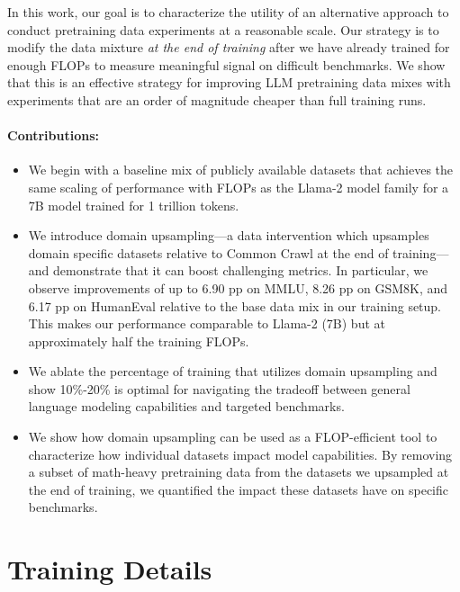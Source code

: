 \documentclass[10pt]{article} %
\begin{document}
In this work, our goal is to characterize the utility of an alternative approach to conduct pretraining data experiments at a reasonable scale.
Our strategy is to modify the data mixture \textit{at the end of training} after we have already trained for enough FLOPs to measure meaningful signal on difficult benchmarks.
We show that this is an effective strategy for improving LLM pretraining data mixes with experiments that are an order of magnitude cheaper than full training runs.

\paragraph{Contributions:} 
\begin{itemize}
\itemsep0em
    \item We begin with a baseline mix of publicly available datasets that achieves the same scaling of performance with FLOPs as the Llama-2 model family for a 7B model trained for 1 trillion tokens.
    \item We introduce domain upsampling---a data intervention which upsamples domain specific datasets relative to Common Crawl at the end of training---and demonstrate that it can boost challenging metrics. In particular, we observe improvements of up to 6.90 pp on MMLU, 8.26 pp on GSM8K, and 6.17 pp on HumanEval relative to the base data mix in our training setup.  This makes our performance comparable to Llama-2 (7B) but at approximately half the training FLOPs.
    \item We ablate the percentage of training that utilizes domain upsampling and show  10\%-20\% is optimal for navigating the tradeoff between general language modeling capabilities and targeted benchmarks.
    \item We show how domain upsampling can be used as a FLOP-efficient tool to characterize how individual datasets impact model capabilities. 
    By removing a subset of math-heavy pretraining data from the datasets we upsampled at the end of training, we quantified the impact these datasets have on specific benchmarks.
\end{itemize}

\section{Training Details}
\end{document}
